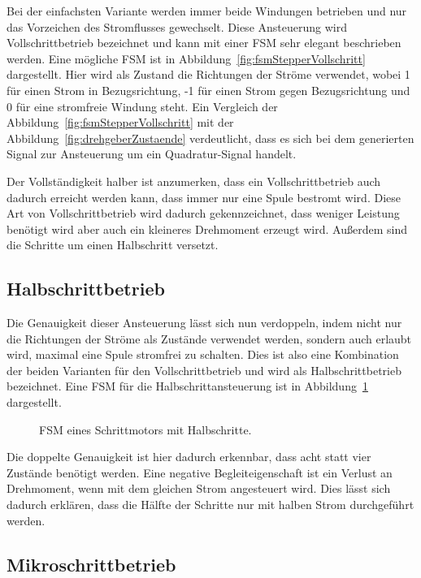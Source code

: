 Bei der einfachsten Variante werden immer beide Windungen betrieben und nur das Vorzeichen des Stromflusses gewechselt.
Diese Ansteuerung wird Vollschrittbetrieb bezeichnet und kann mit einer FSM sehr elegant beschrieben werden.
Eine mögliche FSM ist in Abbildung~\ref{fig:fsmStepperVollschritt} dargestellt.
Hier wird als Zustand die Richtungen der Ströme verwendet, wobei 1 für einen Strom in Bezugsrichtung, -1 für einen Strom gegen Bezugsrichtung und 0 für eine stromfreie Windung steht.
Ein Vergleich der Abbildung~\ref{fig:fsmStepperVollschritt} mit der Abbildung~\ref{fig:drehgeberZustaende} verdeutlicht, dass es sich bei dem generierten Signal zur Ansteuerung um ein Quadratur-Signal handelt.

Der Vollständigkeit halber ist anzumerken, dass ein Vollschrittbetrieb auch dadurch erreicht werden kann, dass immer nur eine Spule bestromt wird.
Diese Art von Vollschrittbetrieb wird dadurch gekennzeichnet, dass weniger Leistung benötigt wird aber auch ein kleineres Drehmoment erzeugt wird.
Außerdem sind die Schritte um einen Halbschritt versetzt. \cite[142]{book:elMaschienenAktuatoren}


\subsection{Halbschrittbetrieb}

Die Genauigkeit dieser Ansteuerung lässt sich nun verdoppeln, indem nicht nur die Richtungen der Ströme als Zustände verwendet werden, sondern auch erlaubt wird, maximal eine Spule stromfrei zu schalten.
Dies ist also eine Kombination der beiden Varianten für den Vollschrittbetrieb und wird als Halbschrittbetrieb bezeichnet.
Eine FSM für die Halbschrittansteuerung ist in Abbildung~\ref{fig:fsmStepperHalbschritt} dargestellt.

\begin{figure}[!h] \centering
	
	\caption{FSM eines Schrittmotors mit Halbschritte.}
	\label{fig:fsmStepperHalbschritt}
\end{figure}

Die doppelte Genauigkeit ist hier dadurch erkennbar, dass acht statt vier Zustände benötigt werden.
Eine negative Begleiteigenschaft ist ein Verlust an Drehmoment, wenn mit dem gleichen Strom angesteuert wird.
Dies lässt sich dadurch erklären, dass die Hälfte der Schritte nur mit halben Strom durchgeführt werden. \cite[105]{book:elAntriebstechnik}

\subsection{Mikroschrittbetrieb}
\label{chap:elektronik:mikroschrittbetrieb}

